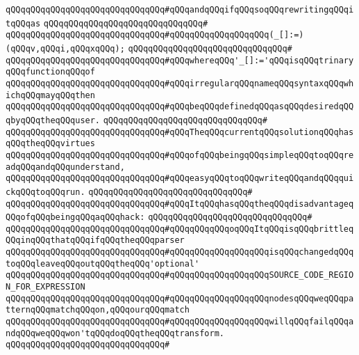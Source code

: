 \verb|qQQqqQQqqQQqqQQqqQQqqQQqqQQqqQQq#qQQqandqQQqifqQQqsoqQQqrewritingqQQqitqQQqas|\newline
\verb|qQQqqQQqqQQqqQQqqQQqqQQqqQQqqQQq#|\newline
\verb|qQQqqQQqqQQqqQQqqQQqqQQqqQQqqQQq#qQQqqQQqqQQqqQQqqQQq(_[]:=)(qQQqv,qQQqi,qQQqxqQQq);|\newline
\verb|qQQqqQQqqQQqqQQqqQQqqQQqqQQqqQQq#|\newline
\verb|qQQqqQQqqQQqqQQqqQQqqQQqqQQqqQQq#qQQqwhereqQQq'_[]:='qQQqisqQQqtrinaryqQQqfunctionqQQqof|\newline
\verb|qQQqqQQqqQQqqQQqqQQqqQQqqQQqqQQq#qQQqirregularqQQqnameqQQqsyntaxqQQqwhichqQQqmayqQQqthen|\newline
\verb|qQQqqQQqqQQqqQQqqQQqqQQqqQQqqQQq#qQQqbeqQQqdefinedqQQqasqQQqdesiredqQQqbyqQQqtheqQQquser.|\newline
\verb|qQQqqQQqqQQqqQQqqQQqqQQqqQQqqQQq#|\newline
\verb|qQQqqQQqqQQqqQQqqQQqqQQqqQQqqQQq#qQQqTheqQQqcurrentqQQqsolutionqQQqhasqQQqtheqQQqvirtues|\newline
\verb|qQQqqQQqqQQqqQQqqQQqqQQqqQQqqQQq#qQQqofqQQqbeingqQQqsimpleqQQqtoqQQqreadqQQqandqQQqunderstand,|\newline
\verb|qQQqqQQqqQQqqQQqqQQqqQQqqQQqqQQq#qQQqeasyqQQqtoqQQqwriteqQQqandqQQqquickqQQqtoqQQqrun.|\newline
\verb|qQQqqQQqqQQqqQQqqQQqqQQqqQQqqQQq#|\newline
\verb|qQQqqQQqqQQqqQQqqQQqqQQqqQQqqQQq#qQQqItqQQqhasqQQqtheqQQqdisadvantageqQQqofqQQqbeingqQQqaqQQqhack:|\newline
\verb|qQQqqQQqqQQqqQQqqQQqqQQqqQQqqQQq#|\newline
\verb|qQQqqQQqqQQqqQQqqQQqqQQqqQQqqQQq#qQQqqQQqqQQqoqQQqItqQQqisqQQqbrittleqQQqinqQQqthatqQQqifqQQqtheqQQqparser|\newline
\verb|qQQqqQQqqQQqqQQqqQQqqQQqqQQqqQQq#qQQqqQQqqQQqqQQqqQQqisqQQqchangedqQQqtoqQQqleaveqQQqoutqQQqtheqQQq'optional'|\newline
\verb|qQQqqQQqqQQqqQQqqQQqqQQqqQQqqQQq#qQQqqQQqqQQqqQQqqQQqSOURCE_CODE_REGION_FOR_EXPRESSION|\newline
\verb|qQQqqQQqqQQqqQQqqQQqqQQqqQQqqQQq#qQQqqQQqqQQqqQQqqQQqnodesqQQqweqQQqpatternqQQqmatchqQQqon,qQQqourqQQqmatch|\newline
\verb|qQQqqQQqqQQqqQQqqQQqqQQqqQQqqQQq#qQQqqQQqqQQqqQQqqQQqwillqQQqfailqQQqandqQQqweqQQqwon'tqQQqdoqQQqtheqQQqtransform.|\newline
\verb|qQQqqQQqqQQqqQQqqQQqqQQqqQQqqQQq#|\newline
